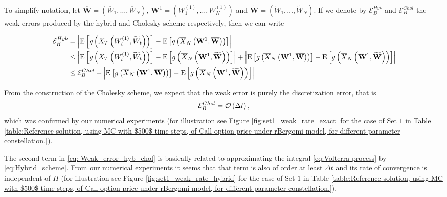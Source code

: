 To simplify notation, let  $\overline{\mathbf{W}}=(\overline{W}_1,\dots,\overline{W}_N)$, $\mathbf{W}^{1}=(W^{(1)}_1,\dots,W^{(1)}_N)$ and $\widetilde{\mathbf{W}}=(\widetilde{W}_1,\dots,\widetilde{W}_N)$. If we denote by $\mathcal{E}_{B}^{Hyb}$ and $\mathcal{E}_{B}^{Chol}$ the weak errors produced by the hybrid and Cholesky scheme respectively, then we can write
\begin{small}
\begin{align}\label{eq: Weak_error_hyb_chol}
\mathcal{E}_{B}^{Hyb}&=\left\lvert\mathrm{E}\left[g\left(X_T\left(W^{(1)}_t,\widetilde{W}_t\right) \right)\right]-\mathrm{E}\left[g\left(\overline{X}_N\left(\mathbf{W}^{1}, \overline{\mathbf{W}}\right) \right)\right]\right\rvert \nonumber\\
&\le \left\lvert\mathrm{E}\left[g\left(X_T\left(W^{(1)}_t,\widetilde{W}_t\right)\right)\right]-\mathrm{E}\left[g\left(\overline{X}_N\left(\mathbf{W}^{1}, \widetilde{\mathbf{W}}\right)\right)\right]\right\rvert+ \left\lvert \mathrm{E}\left[g\left(\overline{X}_N\left(\mathbf{W}^{1}, \overline{\mathbf{W}}\right)\right)\right]- \mathrm{E}\left[g\left(\overline{X}_N\left(\mathbf{W}^{1}, \widetilde{\mathbf{W}}\right)\right)\right]\right\rvert\nonumber\\
&\le \mathcal{E}_{B}^{Chol}+ \left\lvert \mathrm{E}\left[g\left(\overline{X}_N\left(\mathbf{W}^{1}, \overline{\mathbf{W}}\right)\right)\right]- \mathrm{E}\left[g\left(\overline{X}_N\left(\mathbf{W}^{1}, \widetilde{\mathbf{W}}\right)\right)\right]\right\rvert
\end{align}
\end{small}
From the construction of the Cholesky scheme, we expect that the weak error is purely the discretization error, that is
\begin{align*}
\mathcal{E}_{B}^{Chol}={\mathcal{O}}\left(\Delta t\right),
\end{align*}
which was confirmed by our numerical experiments (for illustration see Figure \ref{fig:set1_weak_rate_exact} for the case of Set $1$  in Table \ref{table:Reference solution, using MC with $500$ time steps, of Call option price under rBergomi model, for different parameter constellation.}). 

The second term in \eqref{eq: Weak_error_hyb_chol} is basically related to approximating the integral \eqref{eq:Volterra process}  by \eqref{eq:Hybrid_scheme}. From our numerical experiments it seems that that term is also of order at least $\Delta t$  and its rate of convergence is independent of $H$ (for illustration see Figure \ref{fig:set1_weak_rate_hybrid} for the case of Set $1$  in Table \ref{table:Reference solution, using MC with $500$ time steps, of Call option price under rBergomi model, for different parameter constellation.}).

